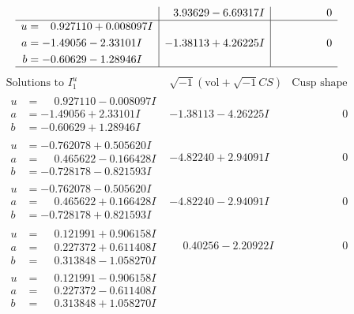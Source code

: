 \documentclass[1p]{elsarticle_modified}
\theoremstyle{definition}
\newcommand{\I}{\sqrt{-1}}
\begin{document}
$$\begin{array}{c|c|c}
 & \phantom{-}3.93629 - 6.69317 I & \phantom{-0.000000 } 0 \\ \hline\begin{aligned}
u &= \phantom{-}0.927110 + 0.008097 I \\
a &= -1.49056 - 2.33101 I \\
b &= -0.60629 - 1.28946 I\end{aligned}
 & -1.38113 + 4.26225 I & \phantom{-0.000000 } 0\\
 \hline 
 \end{array}$$\newpage$$\begin{array}{c|c|c}  
\text{Solutions to }I^u_{1}& \I (\text{vol} + \sqrt{-1}CS) & \text{Cusp shape}\\
 \hline 
\begin{aligned}
u &= \phantom{-}0.927110 - 0.008097 I \\
a &= -1.49056 + 2.33101 I \\
b &= -0.60629 + 1.28946 I\end{aligned}
 & -1.38113 - 4.26225 I & \phantom{-0.000000 } 0 \\ \hline\begin{aligned}
u &= -0.762078 + 0.505620 I \\
a &= \phantom{-}0.465622 - 0.166428 I \\
b &= -0.728178 - 0.821593 I\end{aligned}
 & -4.82240 + 2.94091 I & \phantom{-0.000000 } 0 \\ \hline\begin{aligned}
u &= -0.762078 - 0.505620 I \\
a &= \phantom{-}0.465622 + 0.166428 I \\
b &= -0.728178 + 0.821593 I\end{aligned}
 & -4.82240 - 2.94091 I & \phantom{-0.000000 } 0 \\ \hline\begin{aligned}
u &= \phantom{-}0.121991 + 0.906158 I \\
a &= \phantom{-}0.227372 + 0.611408 I \\
b &= \phantom{-}0.313848 - 1.058270 I\end{aligned}
 & \phantom{-}0.40256 - 2.20922 I & \phantom{-0.000000 } 0 \\ \hline\begin{aligned}
u &= \phantom{-}0.121991 - 0.906158 I \\
a &= \phantom{-}0.227372 - 0.611408 I \\
b &= \phantom{-}0.313848 + 1.058270 I\end{aligned}

\end{array}$$
\end{document}
